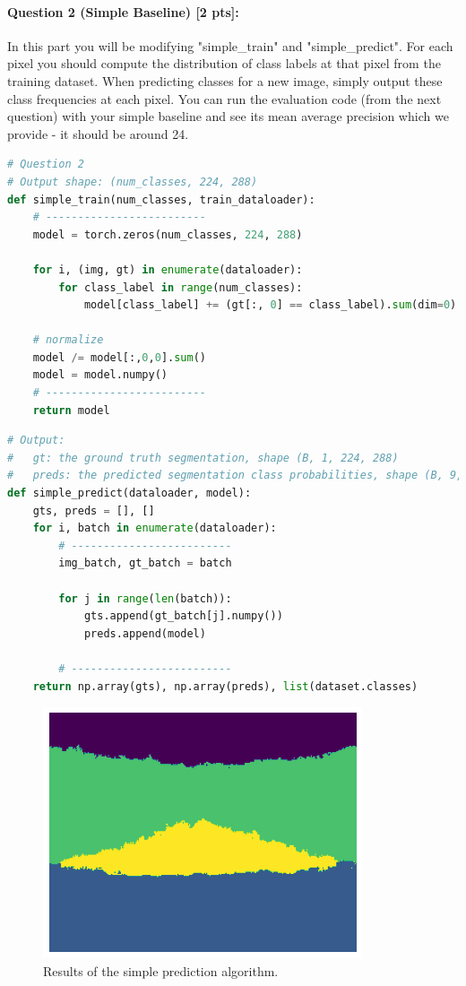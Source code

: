 \documentclass[11pt]{article}
\begin{document}
\paragraph{Question 2 (Simple Baseline) [2 pts]:} 
In this part you will be modifying "simple\_train" and "simple\_predict". For each pixel you should compute the distribution of class labels at that pixel from the training dataset. When predicting classes for a new image, simply output these class frequencies at each pixel. You can run the evaluation code (from the next question) with your simple baseline and see its mean average precision which we provide - it should be around 24.

\begin{lstlisting}[language=Python, basicstyle=\scriptsize]
# Question 2
# Output shape: (num_classes, 224, 288)
def simple_train(num_classes, train_dataloader):
    # -------------------------
    model = torch.zeros(num_classes, 224, 288)

    for i, (img, gt) in enumerate(dataloader):
        for class_label in range(num_classes):
            model[class_label] += (gt[:, 0] == class_label).sum(dim=0)

    # normalize
    model /= model[:,0,0].sum()
    model = model.numpy()
    # -------------------------
    return model
\end{lstlisting}


\begin{lstlisting}[language=Python, basicstyle=\scriptsize]
# Output:
#   gt: the ground truth segmentation, shape (B, 1, 224, 288)
#   preds: the predicted segmentation class probabilities, shape (B, 9, 224, 288) 
def simple_predict(dataloader, model):
    gts, preds = [], []
    for i, batch in enumerate(dataloader):
        # -------------------------
        img_batch, gt_batch = batch
        
        for j in range(len(batch)):
            gts.append(gt_batch[j].numpy())
            preds.append(model)
        
        # -------------------------
    return np.array(gts), np.array(preds), list(dataset.classes)
\end{lstlisting}

\begin{figure}[h]
    \centering
    \includegraphics[width=0.5\linewidth]{simple_predict.png}
    \caption{Results of the simple prediction algorithm.}
    \label{fig:simple-predict}
\end{figure}
\end{document}
